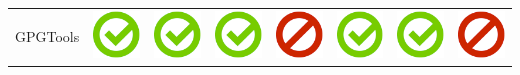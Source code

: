 \documentclass[10pt,foldmark,tumble]{leaflet}
\begin{document}
{{\begin{tabular}{ L{2cm} | C{2cm} | C{2cm} | C{2cm} | C{2cm} | C{2cm} | C{2cm} | C{2cm} | }
GPGTools & \includegraphics[scale=0.1]{pics/haken.png} & \includegraphics[scale=0.1]{pics/haken.png} & \includegraphics[scale=0.1]{pics/haken.png} & \includegraphics[scale=0.1]{pics/nohaken.png} & \includegraphics[scale=0.1]{pics/haken.png} & \includegraphics[scale=0.1]{pics/haken.png} & \includegraphics[scale=0.1]{pics/nohaken.png} \tabularnewline

\end{tabular}}}
\end{document}
